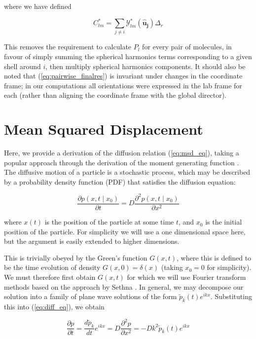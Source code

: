 \documentclass[11pt, a4paper]{article} %
\begin{document}
\begin{appendices}
where we have defined

\begin{equation}
 C_{lm}^{*} = \sum_{j \neq i}  \mathcal{Y}_{lm}^{*}(\boldsymbol{\hat{u}_{j}}) \Delta_{r}
\end{equation}

This removes the requirement to calculate $P_{l}$ for every pair of molecules, in favour of simply summing the spherical harmonics terms corresponding to a given shell around $i$, then multiply spherical harmonics components. It should also be noted that (\ref{eq:pairwise_finalres}) is invariant under changes in the coordinate frame; in our computations all orientations were expressed in the lab frame for each (rather than aligning the coordinate frame with the global director).

\section{Mean Squared Displacement} \label{sec:Diffusion_Theory}
Here, we provide a derivation of the diffusion relation (\ref{eq:msd_eq}), taking a popular approach through the derivation of the moment generating function \cite{Mazo2008, Gardiner2009}. The diffusive motion of a particle is a stochastic process, which may be described by a probability density function (PDF) that satisfies the diffusion equation:

\begin{equation} \label{eq:diff_eq}
\frac{\partial p(x,t \mid x_{0})}{\partial t} = D\frac{\partial^{2} p(x,t \mid x_{0})}{\partial x^{2}}
\end{equation}

where $x(t)$ is the position of the particle at some time $t$, and $x_{0}$ is the initial position of the particle. For simplicity we will use a one dimensional space here, but the argument is easily extended to higher dimensions. 

This is trivially obeyed by the Green's function $G(x,t)$, where this is defined to be the time evolution of density $G(x,0)=\delta(x)$ (taking $x_{0} = 0$ for simplicity). We must therefore first obtain $G(x,t)$ for which we will use Fourier transform methods based on the approach by Sethna \cite{Sethna2006}. In general, we may decompose our solution into a family of plane wave solutions of the form $\tilde{p}_{k}(t)e^{ikx}$. Substituting this into (\ref{eq:diff_eq}), we obtain

\begin{equation}
\frac{\partial p}{\partial t} = \frac{d\tilde{p}_{k}}{dt}e^{ikx} =  D\frac{\partial^{2}p}{\partial x^{2}} = -Dk^{2}\tilde{p}_{k}(t)e^{ikx}
\end{equation}


\end{appendices}
\end{document}

